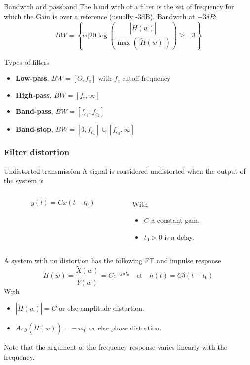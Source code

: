   \begin{block}{Bandwith and passband}
   The band with of a filter is the set of frequency for which the Gain is over a reference
   (usually -3dB).
Bandwith at  $-3dB$:
\begin{equation*}
 BW= \left\{w|20\log\left(\frac{|\tilde H(w)|}{\max(|\tilde H(w)|)}\right)\geq-3\right\}
\end{equation*}
  \end{block} \vspace{-1mm}

  \begin{block}{Types of filters}\vspace{-2mm}
    \begin{itemize}
      \item \textbf{Low-pass},  $BW=[O,f_c]$ with $f_c$ cutoff frequency 
      \item \textbf{High-pass}, $BW=[f_c,\infty]$
      \item \textbf{Band-pass}, $BW=[f_{c_1},f_{c_2}]$
      \item \textbf{Band-stop}, $BW=[0,f_{c_1}]\cup [f_{c_2},\infty]$
    \end{itemize}
  \end{block}

  \frametitle{Filter distortion}
  
  \begin{block}{Undistorted transmission}
A signal is considered undistorted when the output of the system is
\vspace{3mm}
    \begin{columns}
      \begin{column}%
        $$y(t)=Cx(t-t_0)$$
      \end{column}
      \begin{column}%
With
\begin{itemize}
\item $C$ a constant gain.
\item $t_0>0$ is a delay. 
\end{itemize}

      \end{column}
    \end{columns}
  \vspace{3mm}


A system with no distortion has the following FT and impulse response
$$\tilde H(w)=\frac{\tilde X(w)}{\tilde Y(w)}=%
{Ce^{-jwt_0}} \quad \text{et} \quad
h(t)=%
{C\delta(t-t_0)}$$
With
\begin{itemize}
\item $|\tilde H(w)|=C$ or else amplitude distortion.
\item $Arg(\tilde H(w))=-wt_0$ or else phase distortion.
\end{itemize}
Note that the argument of the frequency response varies linearly with the frequency.
  \end{block}


